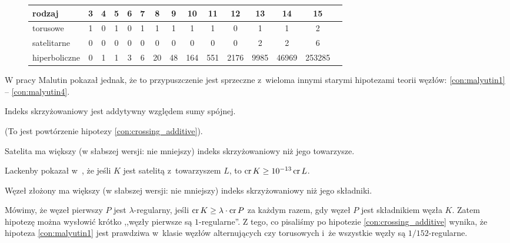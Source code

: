 \begin{figure}[H]
\renewcommand*{\arraystretch}{1.4}
\footnotesize
\begin{longtable}{lcccccccccccccc}
\hline
    \textbf{rodzaj} & 3 & 4 & 5 & 6 & 7 & 8  & 9  & 10  & 11  & 12   & 13   & 14    & 15     \\ \hline \endhead
    torusowe        & 1 & 0 & 1 & 0 & 1 & 1  & 1  & 1   & 1   & 0    & 1    & 1     & 2      \\
    satelitarne     & 0 & 0 & 0 & 0 & 0 & 0  & 0  & 0   & 0   & 0    & 2    & 2     & 6      \\
    hiperboliczne   & 0 & 1 & 1 & 3 & 6 & 20 & 48 & 164 & 551 & 2176 & 9985 & 46969 & 253285 \\
    \hline
\end{longtable}
\normalsize
\end{figure}

W pracy \cite{malyutin16} Malutin pokazał jednak, że to przypuszczenie jest sprzeczne z~wieloma innymi starymi hipotezami teorii węzłów: \ref{con:malyutin1} -- \ref{con:malyutin4}.

\begin{conjecture}
    \label{con:malyutin1}
    Indeks skrzyżowaniowy jest addytywny względem sumy spójnej.
\end{conjecture}

(To jest powtórzenie hipotezy \ref{con:crossing_additive}).

\begin{conjecture}
    Satelita ma większy (w słabszej wersji: nie mniejszy) indeks skrzyżowaniowy niż jego towarzysze.
\end{conjecture}

Lackenby pokazał w~\cite{lackenby14}, że jeśli $K$ jest satelitą z~towarzyszem $L$, to $\operatorname{cr} K \ge 10^{-13} \operatorname{cr} L$.

\begin{conjecture}
    \label{con:malyutin3}
    Węzeł złożony ma większy (w słabszej wersji: nie mniejszy) indeks skrzyżowaniowy niż jego składniki.
\end{conjecture}

Mówimy, że węzeł pierwszy $P$ jest $\lambda$-regularny, jeśli $\operatorname{cr} K \ge \lambda \cdot \operatorname{cr} P$ za każdym razem, gdy węzeł $P$ jest składnikiem węzła $K$.
Zatem hipotezę można wysłowić krótko ,,węzły pierwsze są $1$-regularne''.
Z tego, co pisaliśmy po hipotezie \ref{con:crossing_additive} wynika, że hipoteza \ref{con:malyutin1} jest prawdziwa w~klasie węzłów alternujących czy torusowych i~że wszystkie węzły są $1/152$-regularne.

